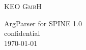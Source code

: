 \documentclass[a4paper]{book}
\begin{document}
\hypersetup{pageanchor=false}
\begin{titlepage}
\vspace*{7cm}

\begin{center}
\textsc{\LARGE KEO GmbH}\\
\end{center}
\begin{center}
{\Large ArgParser for SPINE 1.0}\\
\vspace*{1cm}
{\large confidential}\\
\vspace*{0.5cm}
{\small \today}\\
\end{center}
\end{titlepage}
\clearemptydoublepage
{}
\tableofcontents
\clearemptydoublepage
{}
\hypersetup{pageanchor=true}
\end{document}

